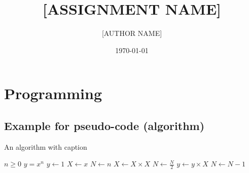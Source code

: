 \documentclass[10pt]{article}
\title{[ASSIGNMENT NAME]}
\author{[AUTHOR NAME]}
\date{\today}
\begin{document}
	\blinddocument
	\section{Programming}
	\subsection{Example for pseudo-code (algorithm)}
	\begin{algorithm}
		\caption{An algorithm with caption}\label{alg:cap}
		\begin{algorithmic}[1]
			\Require $n \geq 0$
			\Ensure $y = x^n$
			\State $y \gets 1$ 
			\State $X \gets x$
			\State $N \gets n$
			\State $X \gets X \times X$
			\State $N \gets \frac{N}{2}$  
			\State $y \gets y \times X$
			\State $N \gets N - 1$
			\EndIf
			\EndWhile
		\end{algorithmic}
	\end{algorithm}
\end{document}
